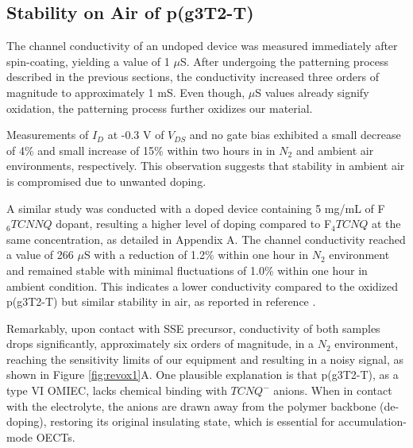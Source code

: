 \subsection{Stability on Air of p(g3T2-T)}
The channel conductivity of an undoped device was measured immediately after spin-coating, yielding a value of 1 $\mu$S. After undergoing the patterning process described in the previous sections, the conductivity increased three orders of magnitude to approximately 1 mS. Even though, $\mu$S values already signify oxidation, the patterning process further oxidizes our material. %

Measurements of $I_{D}$ at -0.3 V of $V_{DS}$ and no gate bias exhibited a small decrease of 4\% and small increase of 15\% within two hours in in $N_{2}$ and ambient air environments, respectively. This observation suggests that stability in ambient air is compromised due to unwanted doping.

A similar study was conducted with a doped device containing 5 mg/mL of F$_{6}TCNNQ$ dopant, resulting a higher level of doping compared to F$_{4}TCNQ$ at the same concentration, as detailed in Appendix A. The channel conductivity reached a value of 266 $\mu$S with a reduction of 1.2\% within one hour in $N_{2}$ environment and remained stable with minimal fluctuations of 1.0\% within one hour in ambient condition. This indicates a lower conductivity compared to the oxidized p(g3T2-T) but similar stability in air, as reported in reference \cite{tanTuningOrganicElectrochemical2022}.

Remarkably, upon contact with SSE precursor, conductivity of both samples drops significantly, approximately six orders of magnitude, in a $N_{2}$ environment, reaching the sensitivity limits of our equipment and resulting in a noisy signal, as shown in Figure \ref{fig:revox1}A. One plausible explanation is that p(g3T2-T), as a type VI OMIEC, lacks chemical binding with $TCNQ^{-}$ anions. When in contact with the electrolyte, the anions are drawn away from the polymer backbone (de-doping), restoring its original insulating state, which is essential for accumulation-mode OECTs.

